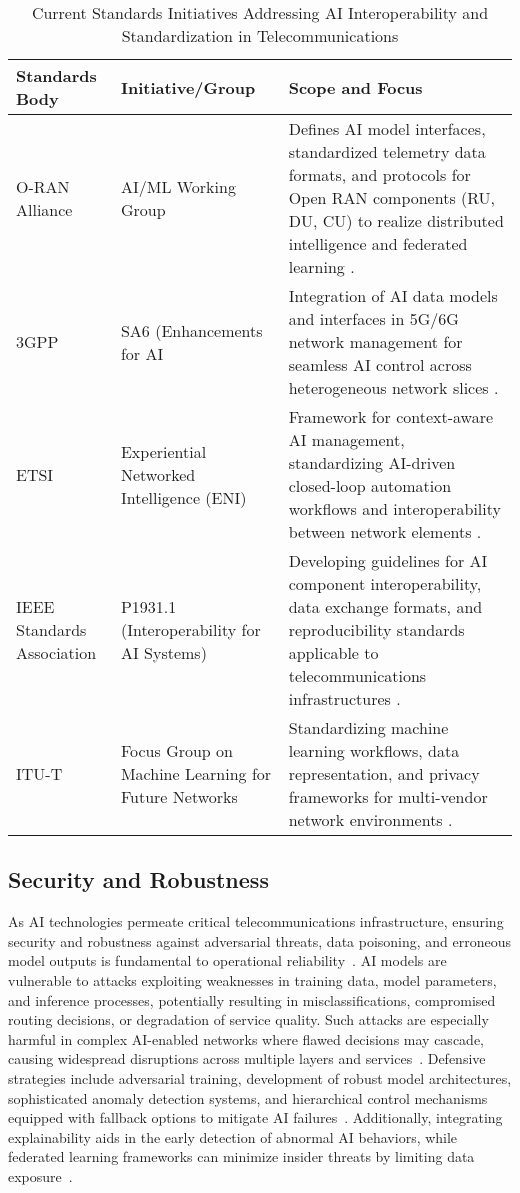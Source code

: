 \documentclass[sigconf]{acmart}
\begin{document}
\begin{table*}[htbp]
\centering
\caption{Current Standards Initiatives Addressing AI Interoperability and Standardization in Telecommunications}
\label{tab:standards_initiatives}
\begin{adjustbox}{max width=\textwidth}
\begin{tabular}{@{}lll@{}}
\toprule
\textbf{Standards Body} & \textbf{Initiative/Group} & \textbf{Scope and Focus} \\ \midrule
O-RAN Alliance & AI/ML Working Group & Defines AI model interfaces, standardized telemetry data formats, and protocols for Open RAN components (RU, DU, CU) to realize distributed intelligence and federated learning \cite{ref54}. \\
3GPP & SA6 (Enhancements for AI & Integration of AI data models and interfaces in 5G/6G network management for seamless AI control across heterogeneous network slices \cite{ref52}. \\
ETSI & Experiential Networked Intelligence (ENI) & Framework for context-aware AI management, standardizing AI-driven closed-loop automation workflows and interoperability between network elements \cite{ref52}. \\
IEEE Standards Association & P1931.1 (Interoperability for AI Systems) & Developing guidelines for AI component interoperability, data exchange formats, and reproducibility standards applicable to telecommunications infrastructures \cite{ref48}. \\
ITU-T & Focus Group on Machine Learning for Future Networks & Standardizing machine learning workflows, data representation, and privacy frameworks for multi-vendor network environments \cite{ref54}. \\
\bottomrule
\end{tabular}
\end{adjustbox}
\end{table*}

\subsection{Security and Robustness}

As AI technologies permeate critical telecommunications infrastructure, ensuring security and robustness against adversarial threats, data poisoning, and erroneous model outputs is fundamental to operational reliability~\cite{ref48,ref50,ref55}. AI models are vulnerable to attacks exploiting weaknesses in training data, model parameters, and inference processes, potentially resulting in misclassifications, compromised routing decisions, or degradation of service quality. Such attacks are especially harmful in complex AI-enabled networks where flawed decisions may cascade, causing widespread disruptions across multiple layers and services~\cite{ref50}. Defensive strategies include adversarial training, development of robust model architectures, sophisticated anomaly detection systems, and hierarchical control mechanisms equipped with fallback options to mitigate AI failures~\cite{ref55}. Additionally, integrating explainability aids in the early detection of abnormal AI behaviors, while federated learning frameworks can minimize insider threats by limiting data exposure~\cite{ref48}.
\end{document}
